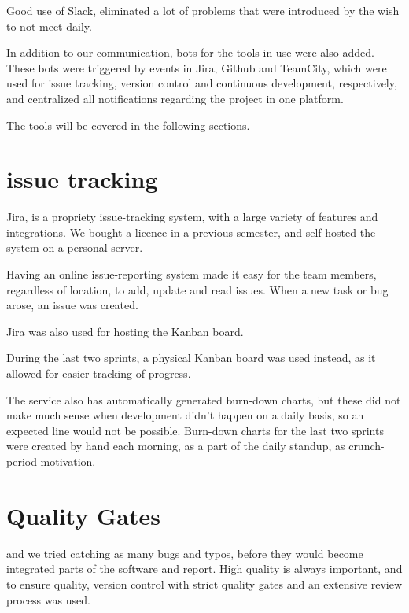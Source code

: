 Good use of Slack, eliminated a lot of problems that were introduced by the wish to not meet daily.

 
In addition to our communication, bots for the tools in use were also added.
These bots were triggered by events in Jira, Github and TeamCity, which were used for issue tracking, version control and continuous development, respectively, and centralized all notifications regarding the project in one platform.

The tools will be covered in the following sections.

\section{issue tracking}
Jira, is a propriety issue-tracking system, with a large variety of features and integrations.
We bought a licence in a previous semester, and self hosted the system on a personal server.


Having an online issue-reporting system made it easy for the team members, regardless of location, to add, update and read issues. 
When a new task or bug arose, an issue was created.

Jira was also used for hosting the Kanban board.

During the last two sprints, a physical Kanban board was used instead, as it allowed for easier tracking of progress.

The service also has automatically generated burn-down charts, but these did not make much sense when development didn't happen on a daily basis, so an expected line would not be possible.
Burn-down charts for the last two sprints were created by hand each morning, as a part of the daily standup, as crunch-period motivation.


\section{Quality Gates}
and we tried catching as many bugs and typos, before they would become integrated parts of the software and report. 
High quality is always important, and to ensure quality, version control with strict quality gates and an extensive review process was used.

